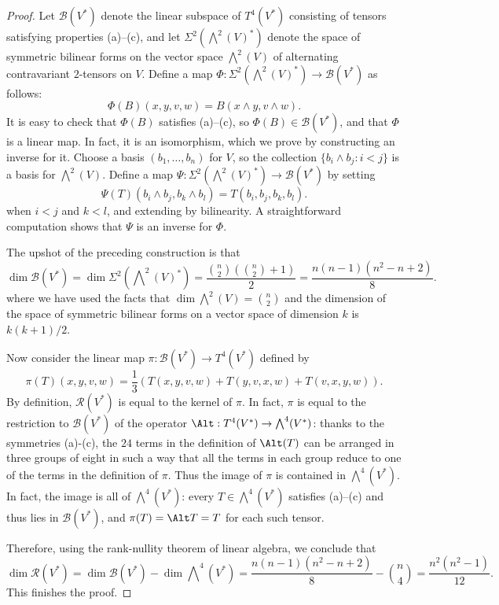 \begin{proof}
Let $\mathcal{B}(V^*)$ denote the linear subspace of $T^4(V^*)$ consisting of tensors satisfying properties (a)--(c), and let $\Sigma^2(\bigwedge^2(V)^*)$ denote the 
space of symmetric bilinear forms on the vector space $\bigwedge^2(V)$ of alternating contravariant $2$-tensors on $V$. Define a map $\Phi:\Sigma^2(\bigwedge^2(V)^*)\to\mathcal{B}(V^*)$ 
as follows:
\[\Phi(B)(x,y,v,w)=B(x\wedge y,v\wedge w).\]
It is easy to check that $\Phi(B)$ satisfies (a)--(c), so $\Phi(B)\in\mathcal{B}(V^*)$, and that $\Phi$ is a linear map. In fact, it is an isomorphism, 
which we prove by constructing an inverse for it. Choose a basis $(b_1,\dots,b_n)$ for $V$, so the collection $\{b_i\wedge b_j:i<j\}$ is a basis for $\bigwedge^2(V)$. 
Define a map $\Psi:\Sigma^2(\bigwedge^2(V)^*)\to\mathcal{B}(V^*)$ by setting
\[\Psi(T)(b_i\wedge b_j,b_k\wedge b_l)=T(b_i,b_j,b_k,b_l).\]
when $i<j$ and $k<l$, and extending by bilinearity. A straightforward computation shows that $\Psi$ is an inverse for $\Phi$.\par
The upshot of the preceding construction is that
\[\dim\mathcal{B}(V^*)=\dim\Sigma^2(\bigwedge\nolimits^2(V)^*)=\frac{\binom{n}{2}(\binom{n}{2}+1)}{2}=\frac{n(n-1)(n^2-n+2)}{8}.\]
where we have used the facts that $\dim\bigwedge^2(V)=\binom{n}{2}$ and the dimension of the space of symmetric bilinear forms on a vector space of dimension $k$ is $k(k+1)/2$.\par
Now consider the linear map $\pi:\mathcal{B}(V^*)\to T^4(V^*)$ defined by
\[\pi(T)(x,y,v,w)=\frac{1}{3}(T(x,y,v,w)+T(y,v,x,w)+T(v,x,y,w)).\]
By definition, $\mathcal{R}(V^*)$ is equal to the kernel of $\pi$. In fact, $\pi$ is equal to the restriction to $\mathcal{B}(V^*)$ of the operator $\Alt:T^4(V^*)\to\bigwedge^4(V^*)$: thanks to the symmetries (a)-(c), the $24$ terms in the definition of $\Alt(T)$ can be arranged in three groups of eight in such a way that all the terms in each group reduce to one of the terms in the definition of $\pi$. Thus the image of $\pi$ is contained in $\bigwedge^4(V^*)$. In fact, the image is all of $\bigwedge^4(V^*)$: every $T\in\bigwedge^4(V^*)$ satisfies (a)--(c) and thus lies in $\mathcal{B}(V^*)$, and $\pi(T)=\Alt T=T$ for each such tensor.\par
Therefore, using the rank-nullity theorem of linear algebra, we conclude that
\[\dim\mathcal{R}(V^*)=\dim\mathcal{B}(V^*)-\dim\bigwedge\nolimits^{4}(V^*)=\frac{n(n-1)(n^2-n+2)}{8}-\binom{n}{4}=\frac{n^2(n^2-1)}{12}.\]
This finishes the proof.
\end{proof}
